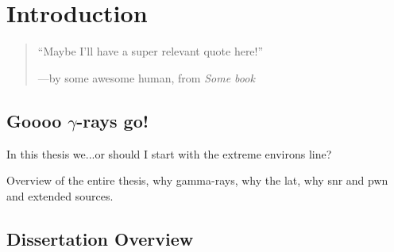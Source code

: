 \chapter{Introduction}
\label{chap:intro}

\begin{quote}
	``Maybe I'll have a super relevant quote here!'' 
	\begin{center}---by some awesome human, from \it{Some book} \end{center}
\end{quote}

\section{Goooo $\gamma$-rays go!}

In this thesis we...or should I start with the extreme environs line?

Overview of the entire thesis, why gamma-rays, why the \gls{lat}, why \gls{snr} and \gls{pwn} and extended sources.
\section{Dissertation Overview}